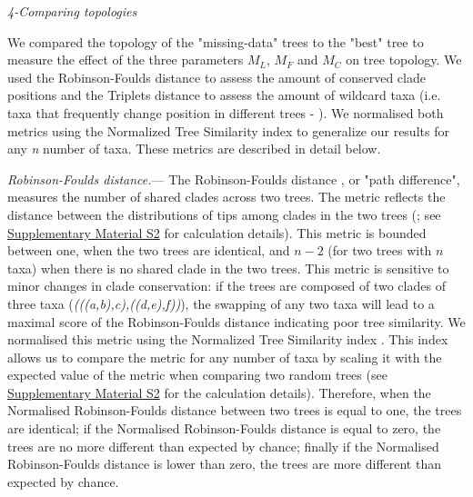 \documentclass[12pt,letterpaper]{article}
\renewcommand{\subsection}[1]{%
\bigskip
\begin{center}
\begin{large}
\normalfont\itshape #1
\end{large}
\end{center}}
\renewcommand{\subsubsection}[1]{%
\vspace{2ex}
\noindent
\textit{#1.}---}
\begin{document}
\subsection{4-Comparing topologies}
We compared the topology of the "missing-data" trees to the "best" tree to measure the effect of the three parameters $M_{L}$, $M_{F}$ and $M_{C}$ on tree topology. We used the Robinson-Foulds distance \citep{RF1981} to assess the amount of conserved clade positions and the Triplets distance \citep{dobson1975triplets} to assess the amount of wildcard taxa  (i.e. taxa that frequently change position in different trees - \citealt{kearneyfragmentary2002}). We normalised both metrics using the Normalized Tree Similarity index \citep{Bogdanowicz2012} to generalize our results for any \textit{n} number of taxa. These metrics are described in detail below.

\subsubsection{Robinson-Foulds distance}
The Robinson-Foulds distance \citep{RF1981}, or "path difference", measures the number of shared clades across two trees. The metric reflects the distance between the distributions of tips among clades in the two trees (\citealt{RF1981}; see \hyperref[SupplementaryMaterial]{Supplementary Material S2} for calculation details). This metric is bounded between one, when the two trees are identical, and $n-2$ (for two trees with $n$ taxa) when there is no shared clade in the two trees. This metric is sensitive to minor changes in clade conservation: if the trees are composed of two clades of three taxa (\textit{(((a,b),c),((d,e),f))}), the swapping of any two taxa will lead to a maximal score of the Robinson-Foulds distance indicating poor tree similarity. We normalised this metric using the Normalized Tree Similarity index \citep{Bogdanowicz2012}. This index allows us to compare the metric for any number of taxa by scaling it with the expected value of the metric when comparing two random trees (see \hyperref[SupplementaryMaterial]{Supplementary Material S2} for the calculation details). Therefore, when the Normalised Robinson-Foulds distance between two trees is equal to one, the trees are identical; if the Normalised Robinson-Foulds distance is equal to zero, the trees are no more different than expected by chance; finally if the Normalised Robinson-Foulds distance is lower than zero, the trees are more different than expected by chance.
\end{document}
